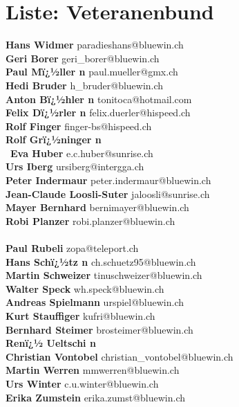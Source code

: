 \documentclass{scrartcl}
\begin{document}
\section*{Liste: Veteranenbund}
\textbf{Hans Widmer } paradieshans@bluewin.ch\\
\textbf{Geri Borer } geri_borer@bluewin.ch\\
\textbf{Paul Mï¿½ller                     n	       } paul.mueller@gmx.ch\\
\textbf{Hedi Bruder } h_bruder@bluewin.ch\\
\textbf{Anton Bï¿½hler                     n	       } tonitoca@hotmail.com\\
\textbf{Felix Dï¿½rler                     n	       } felix.duerler@hispeed.ch\\
\textbf{Rolf Finger } finger-bs@hispeed.ch\\
\textbf{Rolf Grï¿½ninger                     n	    } \\\
\textbf{Eva Huber } e.c.huber@sunrise.ch\\
\textbf{Urs Iberg } ursiberg@intergga.ch\\
\textbf{Peter Indermaur } peter.indermaur@bluewin.ch\\
\textbf{Jean-Claude Loosli-Suter } jaloosli@sunrise.ch\\
\textbf{Mayer Bernhard } bernimayer@bluewin.ch\\
\textbf{Robi Planzer } robi.planzer@bluewin.ch\\
\textbf{} \\
\textbf{Paul Rubeli } zopa@teleport.ch\\
\textbf{Hans Schï¿½tz                     n	       } ch.schuetz95@bluewin.ch\\
\textbf{Martin Schweizer } tinuschweizer@bluewin.ch\\
\textbf{Walter Speck } wh.speck@bluewin.ch\\
\textbf{Andreas Spielmann } urspiel@bluewin.ch\\
\textbf{Kurt Stauffiger } kufri@bluewin.ch\\
\textbf{Bernhard Steimer } brosteimer@bluewin.ch\\
\textbf{Renï¿½ Ueltschi                     n	    } \\
\textbf{Christian Vontobel } christian_vontobel@bluewin.ch\\
\textbf{Martin Werren } mmwerren@bluewin.ch\\
\textbf{Urs Winter } c.u.winter@bluewin.ch\\
\textbf{Erika Zumstein } erika.zumst@bluewin.ch\\
\end{document}
